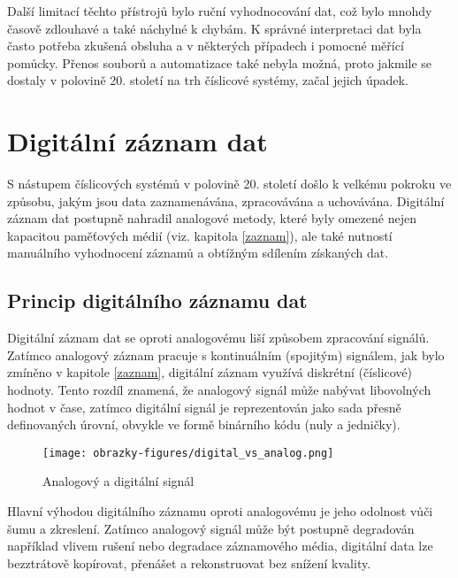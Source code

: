 Další limitací těchto přístrojů bylo ruční vyhodnocování dat, což bylo mnohdy časově zdlouhavé a také náchylné k chybám. K správné interpretaci dat byla často potřeba zkušená obsluha 
a v některých případech i pomocné měřící pomůcky. Přenos souborů a automatizace také nebyla možná, proto jakmile se dostaly v polovině 20. století na trh číslicové systémy, začal jejich 
úpadek. \cite{newcastle_history_of_digital_computers, florian_prechod_a_analog_do_digital}


\section{Digitální záznam dat}
\label{digitalni_zaznam_dat}
S nástupem číslicových systémů v polovině 20. století došlo k velkému pokroku ve způsobu, jakým jsou data zaznamenávána, zpracovávána a uchovávána. Digitální záznam dat postupně nahradil 
analogové metody, které byly omezené nejen kapacitou paměťových médií (viz. kapitola \ref{zaznam}), ale také nutností manuálního vyhodnocení záznamů a obtížným sdílením získaných dat.

\subsection{Princip digitálního záznamu dat}
Digitální záznam dat se oproti analogovému liší způsobem zpracování signálů. Zatímco analogový záznam pracuje s kontinuálním (spojitým) signálem, jak bylo zmíněno v kapitole \ref{zaznam}, 
digitální záznam využívá diskrétní (číslicové) hodnoty. Tento rozdíl znamená, že analogový signál může nabývat libovolných hodnot v čase, zatímco digitální signál je reprezentován jako 
sada přesně definovaných úrovní, obvykle ve formě binárního kódu (nuly a jedničky).

\begin{figure}[h] %
    \centering
    \texttt{[image: obrazky-figures/digital\_vs\_analog.png]}
    \caption{Analogový a digitální signál}
    \label{fig:polygraaf}
\end{figure}

Hlavní výhodou digitálního záznamu oproti analogovému je jeho odolnost vůči šumu a zkreslení. Zatímco analogový signál může být postupně degradován například vlivem rušení nebo degradace 
záznamového média, digitální data lze bezztrátově kopírovat, přenášet a rekonstruovat bez snížení kvality.

